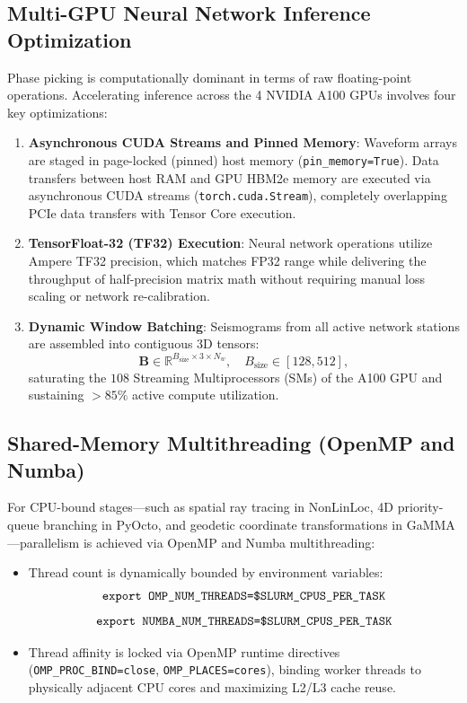 \subsection{Multi-GPU Neural Network Inference Optimization}
Phase picking is computationally dominant in terms of raw floating-point operations. Accelerating inference across the 4 NVIDIA A100 GPUs involves four key optimizations:
\begin{enumerate}
  \item \textbf{Asynchronous CUDA Streams and Pinned Memory}: Waveform arrays are staged in page-locked (pinned) host memory (\texttt{pin\_memory=True}). Data transfers between host RAM and GPU HBM2e memory are executed via asynchronous CUDA streams (\texttt{torch.cuda.Stream}), completely overlapping PCIe data transfers with Tensor Core execution.
  \item \textbf{TensorFloat-32 (TF32) Execution}: Neural network operations utilize Ampere TF32 precision, which matches FP32 range while delivering the throughput of half-precision matrix math without requiring manual loss scaling or network re-calibration.
  \item \textbf{Dynamic Window Batching}: Seismograms from all active network stations are assembled into contiguous 3D tensors:
  \begin{equation}
    \mathbf{B} \in \mathbb{R}^{B_{\mathrm{size}} \times 3 \times N_w}, \quad B_{\mathrm{size}} \in [128, 512],
  \end{equation}
  saturating the $108$ Streaming Multiprocessors (SMs) of the A100 GPU and sustaining $> 85\%$ active compute utilization.
\end{enumerate}

\subsection{Shared-Memory Multithreading (OpenMP and Numba)}
For CPU-bound stages---such as spatial ray tracing in NonLinLoc, 4D priority-queue branching in PyOcto, and geodetic coordinate transformations in GaMMA---parallelism is achieved via OpenMP and Numba multithreading:
\begin{itemize}
  \item Thread count is dynamically bounded by environment variables:
  \begin{equation}
    \text{\texttt{export OMP\_NUM\_THREADS=\$SLURM\_CPUS\_PER\_TASK}}
  \end{equation}
  \begin{equation}
    \text{\texttt{export NUMBA\_NUM\_THREADS=\$SLURM\_CPUS\_PER\_TASK}}
  \end{equation}
  \item Thread affinity is locked via OpenMP runtime directives (\texttt{OMP\_PROC\_BIND=close}, \texttt{OMP\_PLACES=cores}), binding worker threads to physically adjacent CPU cores and maximizing L2/L3 cache reuse.
\end{itemize}

